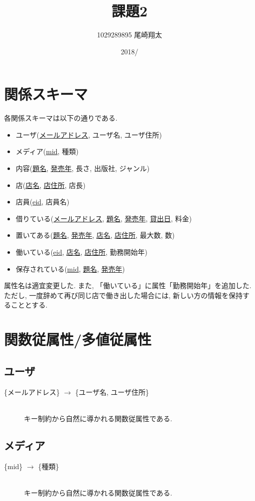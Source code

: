 \documentclass{jarticle}
\begin{document}
\title{課題2}
\author{1029289895 尾崎翔太}
\date{2018/}

\maketitle
\newpage

\section{関係スキーマ}
各関係スキーマは以下の通りである. 
\begin{itemize}
\item ユーザ(\underline{メールアドレス}, ユーザ名, ユーザ住所)
\item メディア(\underline{mid}, 種類)
\item 内容(\underline{題名}, \underline{発売年}, 長さ, 出版社, ジャンル)
\item 店(\underline{店名}, \underline{店住所}, 店長)
\item 店員(\underline{eid}, 店員名)
\item 借りている(\underline{メールアドレス}, \underline{題名}, \underline{発売年}, \underline{貸出日}, 料金)
\item 置いてある(\underline{題名}, \underline{発売年}, \underline{店名}, \underline{店住所}, 最大数, 数)
\item 働いている(\underline{eid}, \underline{店名}, \underline{店住所}, 勤務開始年)
\item 保存されている(\underline{mid}, \underline{題名}, \underline{発売年})
\end{itemize}
属性名は適宜変更した. また, 「働いている」に属性「勤務開始年」を追加した. ただし, 一度辞めて再び同じ店で働き出した場合には, 新しい方の情報を保持することとする.
\section{関数従属性/多値従属性}
\subsection{ユーザ}
\begin{description}
\item[\{メールアドレス\} $\rightarrow$ \{ユーザ名, ユーザ住所\}] \leavevmode \\
キー制約から自然に導かれる関数従属性である.
\end{description}
\subsection{メディア}
\begin{description}
\item[\{mid\} $\rightarrow$ \{種類\}] \leavevmode \\
キー制約から自然に導かれる関数従属性である.
\end{description}
\end{document}
